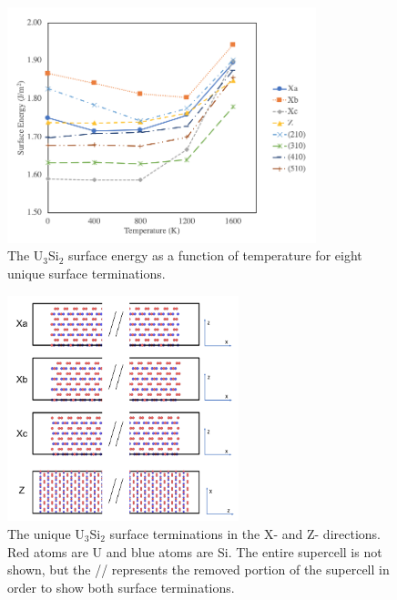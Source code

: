 \documentclass[review]{elsarticle}
\begin{document}
\begin{figure}[h]
 \centering
 \includegraphics[width=0.8\textwidth]{surf_vs_T.png} 
 \caption{The U$_{3}$Si$_{2}$ surface energy as a function of temperature for eight unique surface terminations. }
 \label{fig:surfT}
\end{figure}

\begin{figure}[h]
 \centering
 \includegraphics[width=0.6\textwidth]{surfXa.png} 
 \caption{The unique U$_{3}$Si$_{2}$ surface terminations in the X- and Z- directions. Red atoms are U and blue atoms are Si. The entire supercell is not shown, but the // represents the removed portion of the supercell in order to show both surface terminations. }
 \label{fig:surfXZ}
\end{figure}

\FloatBarrier
\end{document}
